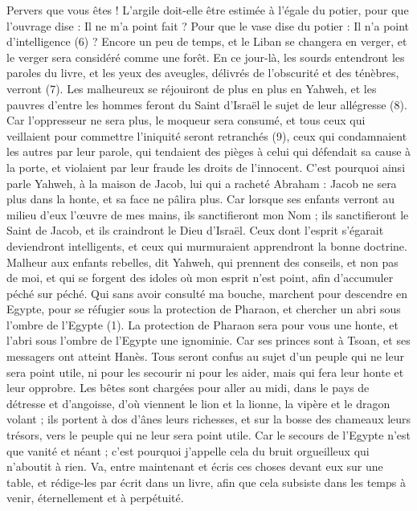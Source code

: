 \begin{multicols}{2}
{Pervers que vous êtes ! L’argile doit-elle être estimée à l’égale du potier, pour que l’ouvrage dise : Il ne m’a point fait ? Pour que le vase dise du potier : Il n’a point d’intelligence (6) ?
Encore un peu de temps, et le Liban se changera en verger, et le verger sera considéré comme une forêt.
En ce jour-là, les sourds entendront les paroles du livre, et les yeux des aveugles, délivrés de l'obscurité et des ténèbres, verront (7).
Les malheureux se réjouiront de plus en plus en Yahweh, et les pauvres d'entre les hommes feront du Saint d'Israël le sujet de leur allégresse (8).
Car l’oppresseur ne sera plus, le moqueur sera consumé, et tous ceux qui veillaient pour commettre l'iniquité seront retranchés (9),
ceux qui condamnaient les autres par leur parole, qui tendaient des pièges à celui qui défendait sa cause à la porte, et violaient par leur fraude les droits de l’innocent.
C'est pourquoi ainsi parle Yahweh, à la maison de Jacob, lui qui a racheté Abraham : Jacob ne sera plus dans la honte, et sa face ne pâlira plus.
Car lorsque ses enfants verront au milieu d’eux l’œuvre de mes mains, ils sanctifieront mon Nom ; ils sanctifieront le Saint de Jacob, et ils craindront le Dieu d'Israël.
Ceux dont l'esprit s’égarait deviendront intelligents, et ceux qui murmuraient apprendront la bonne doctrine.
\VerseOne{}Malheur aux enfants rebelles, dit Yahweh, qui prennent des conseils, et non pas de moi, et qui se forgent des idoles où mon esprit n'est point, afin d’accumuler péché sur péché.
Qui sans avoir consulté ma bouche, marchent pour descendre en Egypte, pour se réfugier sous la protection de Pharaon, et chercher un abri sous l'ombre de l'Egypte (1).
La protection de Pharaon sera pour vous une honte, et l’abri sous l'ombre de l'Egypte une ignominie.
Car ses princes sont à Tsoan, et ses messagers ont atteint Hanès.
Tous seront confus au sujet d’un peuple qui ne leur sera point utile, ni pour les secourir ni pour les aider, mais qui fera leur honte et leur opprobre.
Les bêtes sont chargées pour aller au midi, dans le pays de détresse et d’angoisse, d’où viennent le lion et la lionne, la vipère et le dragon volant ; ils portent à dos d’ânes leurs richesses, et sur la bosse des chameaux leurs trésors, vers le peuple qui ne leur sera point utile.
Car le secours de l’Egypte n’est que vanité et néant ; c'est pourquoi j’appelle cela du bruit orgueilleux qui n’aboutit à rien.
Va, entre maintenant et écris ces choses devant eux sur une table, et rédige-les par écrit dans un livre, afin que cela subsiste dans les temps à venir, éternellement et à perpétuité.
}
\end{multicols}
